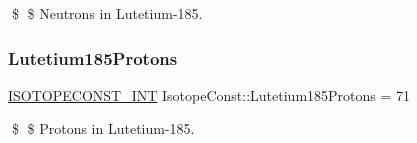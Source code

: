 \$ \$ Neutrons in Lutetium-\/185. \mbox{\label{group___isotope_const-_lutetium-_lu185_ga65ffc3e46054814a6e5275bcaf4b4ede}} 
\subsubsection{\texorpdfstring{Lutetium185\+Protons}{Lutetium185Protons}}
{\footnotesize\ttfamily \mbox{\hyperlink{group___isotope_const-_macros_ga5f18360b3e99483a35c32d789e62621c}{I\+S\+O\+T\+O\+P\+E\+C\+O\+N\+S\+T\+\_\+\+I\+NT}} Isotope\+Const\+::\+Lutetium185\+Protons = 71}

\$ \$ Protons in Lutetium-\/185. 